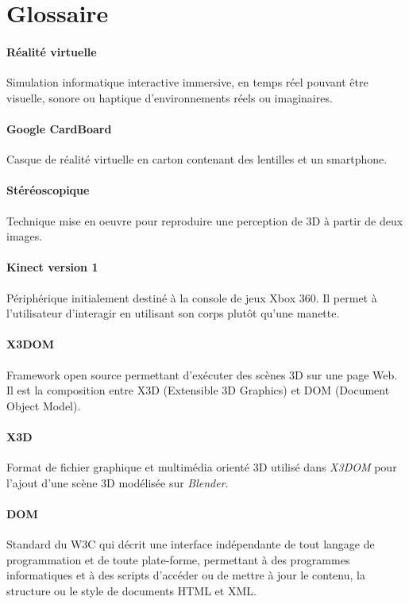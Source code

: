 \appendix
{}
\chapter{Glossaire} \label{glossaire}

\subsubsection*{Réalité virtuelle}
Simulation informatique interactive immersive, en temps réel pouvant être visuelle, sonore ou haptique d'environnements réels ou imaginaires.

\subsubsection*{Google CardBoard}
Casque de réalité virtuelle en carton contenant des lentilles et un smartphone.

\subsubsection*{Stéréoscopique}
Technique mise en oeuvre pour reproduire une perception de 3D à partir de deux images.

\subsubsection*{Kinect version 1}
Périphérique initialement destiné à la console de jeux Xbox 360. Il permet à l'utilisateur d'interagir en utilisant son corps plutôt qu'une manette.

\subsubsection*{X3DOM}
\textsf{Framework} open source permettant d'exécuter des scènes 3D sur une page Web. Il est la composition entre \textsf{X3D} (Extensible 3D Graphics) et \textsf{DOM} (Document Object Model).

\subsubsection*{X3D}
Format de fichier graphique et multimédia orienté 3D utilisé dans \textit{X3DOM} pour l'ajout d'une scène 3D modélisée sur \textit{Blender}.

\subsubsection*{DOM} 
Standard du W3C qui décrit une interface indépendante de tout langage de programmation et de toute plate-forme, permettant à des programmes informatiques et à des scripts d'accéder ou de mettre à jour le contenu, la structure ou le style de documents HTML et XML.

